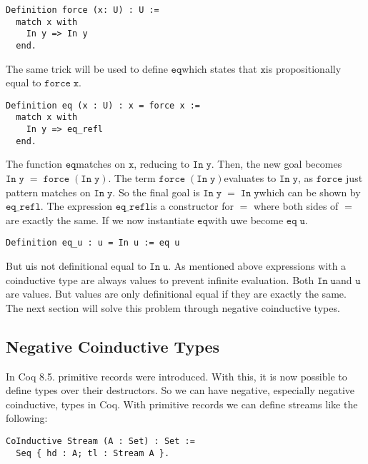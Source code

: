 \documentclass[a4paper,cleardoubleempty,BCOR1cm]{scrbook}
\begin{document}
\begin{verbatim}
Definition force (x: U) : U :=
  match x with
    In y => In y
  end.
\end{verbatim}

The same trick will be used to define $\mathtt{eq}$\;which states that $\mathtt{x}$\;is
propositionally equal to $\mathtt{force\;x}$.

\begin{verbatim}
Definition eq (x : U) : x = force x :=
  match x with
    In y => eq_refl
  end.
\end{verbatim}

The function $\mathtt{eq}$\;matches on $\mathtt{x}$, reducing to $\mathtt{In\;y}$. Then, the new goal
becomes $\mathtt{In\;y\;=\;force\;(In\;y)}$. The term $\mathtt{force\;(In\;y)}$\;evaluates to $\mathtt{In\;y}$, as $\mathtt{force}$
just pattern matches on $\mathtt{In\;y}$. So the final goal is $\mathtt{In\;y\;=\;In\;y}$\;which
can be shown by $\mathtt{eq\_refl}$. The expression $\mathtt{eq\_refl}$\;is a constructor for $\mathtt{=}$
where both sides of $\mathtt{=}$\;are exactly the same. If we now instantiate $\mathtt{eq}$\;with
$\mathtt{u}$\;we become $\mathtt{eq\;u}$.

\begin{verbatim}
Definition eq_u : u = In u := eq u
\end{verbatim}

But $\mathtt{u}$\;is not definitional equal to $\mathtt{In\;u}$.  As mentioned above expressions
with a coinductive type are always values to prevent infinite evaluation.
Both $\mathtt{In\;u}$\;and $\mathtt{u}$\;are values. But values are only
definitional equal if they are exactly the same.  The next section will
solve this problem through negative coinductive types.

\subsection{Negative Coinductive Types}
\label{sec:orgf6a06b9}
In Coq 8.5. primitive records were introduced. With this, it is now possible
to define types over their destructors. So we can have negative, especially
negative coinductive, types in Coq. With primitive records we can define
streams like the following:

\begin{verbatim}
CoInductive Stream (A : Set) : Set :=
  Seq { hd : A; tl : Stream A }.
\end{verbatim}
\end{document}
